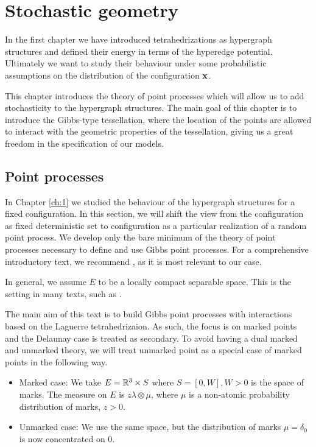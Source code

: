 \chapter{Stochastic geometry}\label{ch:2}
In the first chapter we have introduced tetrahedrizations as hypergraph structures and defined their energy in terms of the hyperedge potential. Ultimately we want to study their behaviour under some probabilistic assumptions on the distribution of the configuration ${\mathbf{x}}$. 

This chapter introduces the theory of point processes which will allow us to add stochasticity to the hypergraph structures. The main goal of this chapter is to introduce the Gibbs-type tessellation, where the location of the points are allowed to interact with the geometric properties of the tessellation, giving us a great freedom in the specification of our models.

\section{Point processes}
In Chapter \ref{ch:1} we studied the behaviour of the hypergraph structures for a fixed configuration. In this section, we will shift the view from the configuration as fixed deterministic set to configuration as a particular realization of a random point process.
We develop only the bare minimum of the theory of point processes necessary to define and use Gibbs point processes. For a comprehensive introductory text, we recommend \cite{MollerWaagepetersen2003}, as it is most relevant to our case. \newline

\noindent In general, we assume $E$ to be a locally compact separable space. This is the setting in many texts, such as \cite{SchneiderWeil2008}.

The main aim of this text is to build Gibbs point processes with interactions based on the Laguerre tetrahedrizaion. As such, the focus is on marked points and the Delaunay case is treated as secondary. To avoid having a dual marked and unmarked theory, we will treat unmarked point as a special case of marked points in the following way. 

\begin{itemize}
	\item Marked case: We take $E={\mathbb R^3}\times S$ where $S=[0,W],W>0$ is the space of marks. The measure on $E$ is $z\lambda \otimes \mu$, where $\mu$ is a non-atomic probability distribution of marks, $z>0$. 
	\item Unmarked case: We use the same space, but the distribution of marks $\mu=\delta_0$ is now concentrated on $0$.
\end{itemize}


